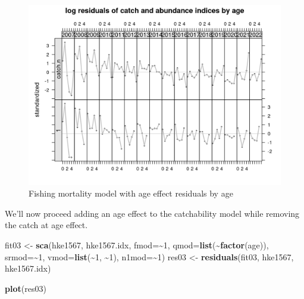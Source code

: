 \documentclass[
]{book}
\newenvironment{Shaded}{\begin{snugshade}}{\end{snugshade}}
\newcommand{\AttributeTok}[1]{\textcolor[rgb]{0.13,0.29,0.53}{#1}}
\newcommand{\DecValTok}[1]{\textcolor[rgb]{0.00,0.00,0.81}{#1}}
\newcommand{\FunctionTok}[1]{\textcolor[rgb]{0.13,0.29,0.53}{\textbf{#1}}}
\newcommand{\NormalTok}[1]{#1}
\newcommand{\OtherTok}[1]{\textcolor[rgb]{0.56,0.35,0.01}{#1}}
\newcommand{\SpecialCharTok}[1]{\textcolor[rgb]{0.81,0.36,0.00}{\textbf{#1}}}
\begin{document}
\begin{figure}
\centering
\includegraphics{_bookdown_files/_main_files/figure-html/fageresbyage-1.png}
\caption{\label{fig:fageresbyage}Fishing mortality model with age effect residuals by age}
\end{figure}

We'll now proceed adding an age effect to the catchability model while removing the catch at age effect.

\begin{Shaded}
\begin{Highlighting}[]
\NormalTok{fit03 }\OtherTok{\textless{}{-}} \FunctionTok{sca}\NormalTok{(hke1567, hke1567.idx,}
    \AttributeTok{fmod=}\SpecialCharTok{\textasciitilde{}}\DecValTok{1}\NormalTok{,}
    \AttributeTok{qmod=}\FunctionTok{list}\NormalTok{(}\SpecialCharTok{\textasciitilde{}}\FunctionTok{factor}\NormalTok{(age)),}
    \AttributeTok{srmod=}\SpecialCharTok{\textasciitilde{}}\DecValTok{1}\NormalTok{,}
    \AttributeTok{vmod=}\FunctionTok{list}\NormalTok{(}\SpecialCharTok{\textasciitilde{}}\DecValTok{1}\NormalTok{, }\SpecialCharTok{\textasciitilde{}}\DecValTok{1}\NormalTok{),}
    \AttributeTok{n1mod=}\SpecialCharTok{\textasciitilde{}}\DecValTok{1}\NormalTok{)}
\NormalTok{res03 }\OtherTok{\textless{}{-}} \FunctionTok{residuals}\NormalTok{(fit03, hke1567, hke1567.idx)}
\end{Highlighting}
\end{Shaded}

\begin{Shaded}
\begin{Highlighting}[]
\FunctionTok{plot}\NormalTok{(res03)}
\end{Highlighting}
\end{Shaded}
\end{document}
